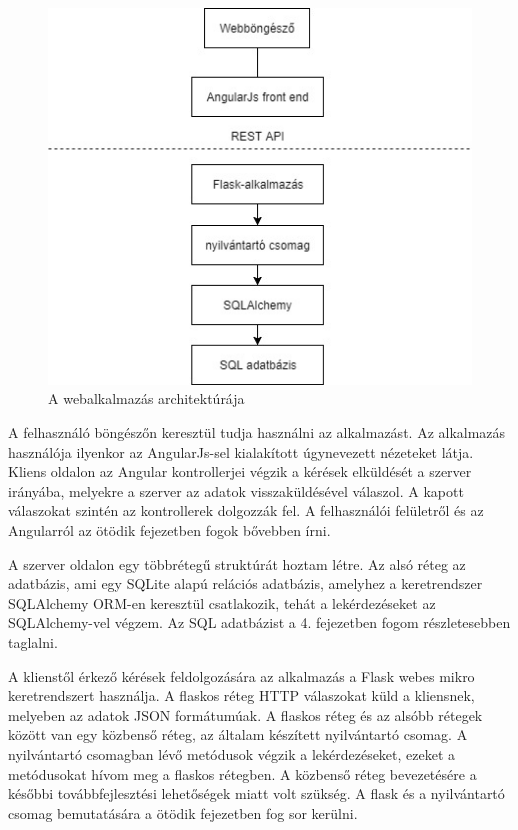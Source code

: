 \begin{figure}
\centering
\includegraphics[scale=0.8]{kepek/architecture.jpg}
\caption{A webalkalmazás architektúrája}
\label{fig:architecture1}
\end{figure}

A felhasználó böngészőn keresztül tudja használni az alkalmazást. Az alkalmazás használója ilyenkor az AngularJs-sel kialakított úgynevezett nézeteket látja. Kliens oldalon az Angular kontrollerjei végzik a kérések elküldését a szerver irányába, melyekre a szerver az adatok visszaküldésével válaszol. A kapott válaszokat szintén az kontrollerek dolgozzák fel. A felhasználói felületről és az Angularról az ötödik fejezetben fogok bővebben írni.


A szerver oldalon egy többrétegű struktúrát hoztam létre. Az alsó réteg az adatbázis, ami egy SQLite alapú relációs adatbázis, amelyhez a keretrendszer SQLAlchemy ORM-en keresztül csatlakozik, tehát a lekérdezéseket az SQLAlchemy-vel végzem. Az SQL adatbázist a 4. fejezetben fogom részletesebben taglalni.

A klienstől érkező kérések feldolgozására az alkalmazás a Flask webes mikro keretrendszert használja. A flaskos réteg HTTP válaszokat küld a kliensnek, melyeben az adatok JSON formátumúak. A flaskos réteg és az alsóbb rétegek között van egy közbenső réteg, az általam készített nyilvántartó csomag. A nyilvántartó csomagban lévő metódusok végzik a lekérdezéseket, ezeket a metódusokat hívom meg a flaskos rétegben. A közbenső réteg bevezetésére a későbbi továbbfejlesztési lehetőségek miatt volt szükség. A flask és a nyilvántartó csomag bemutatására a ötödik fejezetben fog sor kerülni.

